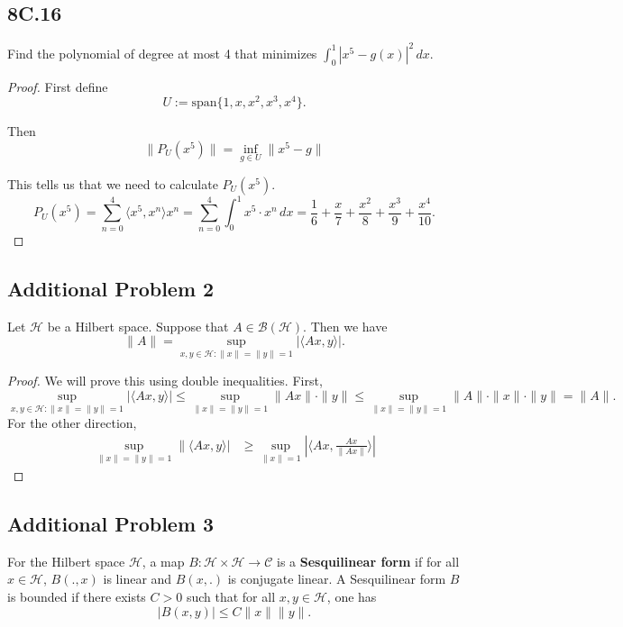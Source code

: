 \documentclass[12pt]{amsart}
\newcommand{\eq}[1]{\begin{equation*}#1\end{equation*}}
\newcommand{\al}[1]{\begin{align*}#1\end{align*}}
\newcommand{\qeq}[1]{\begin{equation}#1\end{equation}}
\begin{document}
\subsection*{8C.16}

Find the polynomial of degree at most 4 that minimizes $\int_{0}^{1} |x^5 - g(x)|^2\,dx$.

\begin{proof}
    First define
    \eq{U := \text{span} \{ 1, x, x^2, x^3, x^4\}.}

    Then
    \eq{\|P_U(x^5) \| = \inf_{g \in U} \|x^5 - g\|}

    This tells us that we need to calculate $P_U(x^5)$.
    \eq{P_U(x^5) = \sum_{n=0}^{4} \langle x^5, x^n\rangle x^n = \sum_{n=0}^{4} \int_{0}^{1} x^5 \cdot x^n \,dx = \frac{1}{6} + \frac{x}{7} + \frac{x^2}{8} + \frac{x^3}{9} + \frac{x^4}{10}.}
\end{proof}

\subsection*{Additional Problem 2}

Let $\mathscr{H}$ be a Hilbert space. Suppose that $A \in \mathcal{B}(\mathscr{H})$. Then we have 
\eq{\|A\| = \sup_{x, y \in \mathscr{H} : \|x\| = \|y\| = 1} |\langle Ax, y \rangle|.}

\begin{proof}
    We will prove this using double inequalities. First,
    \eq{\sup_{x, y \in \mathscr{H} : \|x\| = \|y\| = 1} |\langle Ax, y \rangle| \leq \sup_{\|x\| = \|y\| = 1} \|Ax\| \cdot \|y\| \leq \sup_{\|x\| = \|y\| = 1}\|A\| \cdot \|x\| \cdot \|y\| = \|A\|.}
    For the other direction,
    \al{\sup_{\|x\| = \|y\| = 1} \|\langle Ax, y\rangle| &\geq \sup_{\|x\| = 1} |\langle Ax, \frac{Ax}{\|Ax\|} \rangle |}
\end{proof}

\subsection*{Additional Problem 3}

For the Hilbert space $\mathscr{H}$, a map $B : \mathscr{H} \times \mathscr{H} \to \mathcal{C}$ is a \textbf{Sesquilinear form} if for all $x \in \mathscr{H}$, $B(., x)$ is linear and $B(x, .)$ is conjugate linear. A Sesquilinear form $B$ is bounded if there exists $C > 0$ such that for all $x, y \in \mathscr{H}$, one has
    \qeq{|B(x, y)| \leq C \|x\| \|y\|. \label{eq:1}}
\end{document}

